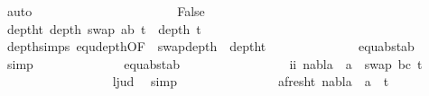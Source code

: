 \begin{isabellebody}
\ auto\isanewline
\ \ \ \ \ \ \ \ \ \isamarkupfalse%
\isanewline
\ \ \ \ \ \ \ \ \ \ \ \isamarkupfalse%
\ False\isanewline
\isanewline
\ \ \ \ \ \ \ \ \ \ \ \isamarkupfalse%
\ deptht{}{\isacharcolon}{\kern0pt}\ {\isachardoublequoteopen}depth\ {\isacharparenleft}{\kern0pt}swap\ {\isacharbrackleft}{\kern0pt}{\isacharparenleft}{\kern0pt}a{\isacharcomma}{\kern0pt}b{\isacharparenright}{\kern0pt}{\isacharbrackright}{\kern0pt}\ t{}{\isacharprime}{\kern0pt}{\isacharparenright}{\kern0pt}\ {\isacharless}{\kern0pt}\ depth\ t{}{\isachardoublequoteclose}\isanewline
\ \ \ \ \ \ \ \ \ \ \ \ \ \ \isamarkupfalse%
\ depth{\isachardot}{\kern0pt}simps{\isacharparenleft}{\kern0pt}{}{\isacharparenright}{\kern0pt}\ equ{\isacharunderscore}{\kern0pt}depth{\isacharbrackleft}{\kern0pt}OF\ {}{\isacharparenleft}{\kern0pt}{}{\isacharparenright}{\kern0pt}{\isacharbrackright}{\kern0pt}\ swap{\isacharunderscore}{\kern0pt}depth\ {}{\isacharparenleft}{\kern0pt}{}{\isacharparenright}{\kern0pt}\ deptht{}\isanewline
\ \ \ \ \ \ \ \ \ \ \ \ \ \ equ{\isacharunderscore}{\kern0pt}abst{\isacharunderscore}{\kern0pt}ab{\isacharparenleft}{\kern0pt}{}{\isacharparenright}{\kern0pt}\ \isamarkupfalse%
\ simp\isanewline
\isanewline
\ \ \ \ \ \ \ \ \ \ \ \ \isamarkupfalse%
\ equ{\isacharunderscore}{\kern0pt}abst{\isacharunderscore}{\kern0pt}ab{\isacharparenleft}{\kern0pt}{}{\isacharcomma}{\kern0pt}{}{\isacharcomma}{\kern0pt}{}{\isacharparenright}{\kern0pt}\ {}{\isacharparenleft}{\kern0pt}{}{\isacharcomma}{\kern0pt}{}{\isacharcomma}{\kern0pt}{}{\isacharparenright}{\kern0pt}\isanewline
\ \ \ \ \ \ \ \ \ \ \ \ \ \ \isamarkupfalse%
\ ii{\isacharcolon}{\kern0pt}\ {\isachardoublequoteopen}nabla\ {\isasymturnstile}\ a\ {\isasymsharp}\ swap\ {\isacharbrackleft}{\kern0pt}{\isacharparenleft}{\kern0pt}b{\isacharcomma}{\kern0pt}c{\isacharparenright}{\kern0pt}{\isacharbrackright}{\kern0pt}\ t{}{\isacharprime}{\kern0pt}{\isachardoublequoteclose}\isanewline
\ \ \ \ \ \ \ \ \ \ \ \ \ \ \ \ \isamarkupfalse%
\ l{}{\isacharunderscore}{\kern0pt}jud\ \isamarkupfalse%
\ simp\isanewline
\isanewline
\ \ \ \ \ \ \ \ \ \ \ \ \isamarkupfalse%
\ \isamarkupfalse%
\ a{\isacharunderscore}{\kern0pt}fresh{\isacharunderscore}{\kern0pt}t{}{\isacharcolon}{\kern0pt}\ {\isachardoublequoteopen}nabla\ {\isasymturnstile}\ a\ {\isasymsharp}\ t{}{\isacharprime}{\kern0pt}{\isachardoublequoteclose}\isanewline

\end{isabellebody}
